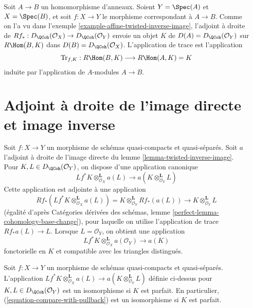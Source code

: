 \begin{example}
\label{example-trace-affine}
Soit $A \to B$ un homomorphisme d'anneaux. Soient $Y = \Spec(A)$ et $X = \Spec(B)$, et soit $f : X \to Y$ le morphisme correspondant à $A \to B$. Comme on l'a vu dans l'exemple \ref{example-affine-twisted-inverse-image}, l'adjoint à droite de
$Rf_* : D_\QCoh(\mathcal{O}_X) \to D_\QCoh(\mathcal{O}_Y)$
envoie un objet $K$ de $D(A) = D_\QCoh(\mathcal{O}_Y)$ sur $R\Hom(B, K)$ dans $D(B) = D_\QCoh(\mathcal{O}_X)$. L'application de trace est l'application
$$
\text{Tr}_{f, K} : R\Hom(B, K) \longrightarrow R\Hom(A, K) = K
$$
induite par l'application de $A$-modules $A \to B$.
\end{example}




\section{Adjoint à droite de l'image directe et image inverse}
\label{section-compare-with-pullback}

\noindent
Soit $f : X \to Y$ un morphisme de schémas quasi-compacts et quasi-séparés. Soit $a$ l'adjoint à droite de l'image directe du lemme \ref{lemma-twisted-inverse-image}. Pour $K, L \in D_\QCoh(\mathcal{O}_Y)$, on dispose d'une application canonique
$$
Lf^*K \otimes^\mathbf{L}_{\mathcal{O}_X} a(L)
\longrightarrow
a(K \otimes_{\mathcal{O}_Y}^\mathbf{L} L)
$$
Cette application est adjointe à une application
$$
Rf_*(Lf^*K \otimes^\mathbf{L}_{\mathcal{O}_X} a(L)) =
K \otimes^\mathbf{L}_{\mathcal{O}_Y} Rf_*(a(L))
\longrightarrow
K \otimes^\mathbf{L}_{\mathcal{O}_Y} L
$$
(égalité d'après Catégories dérivées des schémas, lemme \ref{perfect-lemma-cohomology-base-change}), pour laquelle on utilise l'application de trace $Rf_*a(L) \to L$. Lorsque $L = \mathcal{O}_Y$, on obtient une application
\begin{equation}
\label{equation-compare-with-pullback}
Lf^*K \otimes^\mathbf{L}_{\mathcal{O}_X} a(\mathcal{O}_Y) \longrightarrow a(K)
\end{equation}
fonctorielle en $K$ et compatible avec les triangles distingués.

\begin{lemma}
\label{lemma-compare-with-pullback-perfect}
Soit $f : X \to Y$ un morphisme de schémas quasi-compacts et quasi-séparés. L'application
$Lf^*K \otimes^\mathbf{L}_{\mathcal{O}_X} a(L) \to
a(K \otimes_{\mathcal{O}_Y}^\mathbf{L} L)$
définie ci-dessus pour $K, L \in D_\QCoh(\mathcal{O}_Y)$ est un isomorphisme si $K$ est parfait. En particulier, (\ref{equation-compare-with-pullback}) est un isomorphisme si $K$ est parfait.
\end{lemma}

